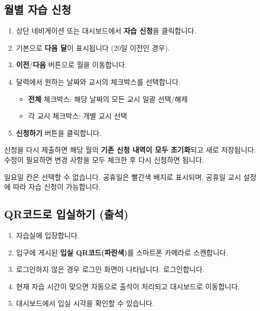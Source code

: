 \documentclass[a4paper,12pt]{article}
\newcommand{\menu}[1]{\textcolor{primary}{\textbf{#1}}}
\begin{document}
\subsection{월별 자습 신청}

\begin{enumerate}[leftmargin=1.5em]
    \item 상단 네비게이션 또는 대시보드에서 \menu{자습 신청}을 클릭합니다.
    \item 기본으로 \textbf{다음 달}이 표시됩니다 (20일 이전인 경우).
    \item \menu{이전}/\menu{다음} 버튼으로 월을 이동합니다.
    \item 달력에서 원하는 날짜와 교시의 체크박스를 선택합니다.
    \begin{itemize}
        \item \textbf{전체} 체크박스: 해당 날짜의 모든 교시 일괄 선택/해제
        \item 각 교시 체크박스: 개별 교시 선택
    \end{itemize}
    \item \menu{신청하기} 버튼을 클릭합니다.
\end{enumerate}

\begin{notebox}
  신청을 다시 제출하면 해당 월의 \textbf{기존 신청 내역이 모두 초기화}되고 새로 저장됩니다.
  수정이 필요하면 변경 사항을 모두 체크한 후 다시 신청하면 됩니다.
\end{notebox}

\begin{warnbox}
  일요일 칸은 선택할 수 없습니다. 공휴일은 빨간색 배지로 표시되며,
  공휴일 교시 설정에 따라 자습 신청이 가능합니다.
\end{warnbox}

\subsection{QR코드로 입실하기 (출석)}

\begin{enumerate}[leftmargin=1.5em]
    \item 자습실에 입장합니다.
    \item 입구에 게시된 \textbf{입실 QR코드(파란색)}를 스마트폰 카메라로 스캔합니다.
    \item 로그인하지 않은 경우 로그인 화면이 나타납니다. 로그인합니다.
    \item 현재 자습 시간이 맞으면 자동으로 출석이 처리되고 대시보드로 이동합니다.
    \item 대시보드에서 입실 시각을 확인할 수 있습니다.
\end{enumerate}
\end{document}
